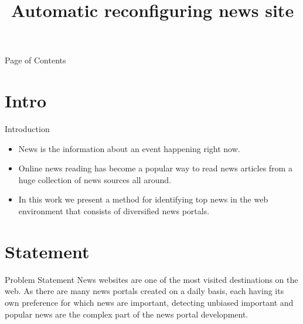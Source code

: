\documentclass{beamer}
\title{Automatic reconfiguring news site}
\begin{document}
	\begin{frame}{Page of Contents}
		\tableofcontents
	\end{frame}
	\section{Intro}
	\begin{frame}{Introduction}
		\begin{itemize}
			\item \Large{News is the information about an event happening right
			now.}
			\item Online news reading has become a popular way to read news articles from a huge collection of news sources all around.
			\item In this work we present a method for identifying top news in the web environment that consists of diversiﬁed news portals. 
		\end{itemize}
	\end{frame}
	\section{Statement}
	\begin{frame}{Problem Statement}
		 \Large{News websites are one of the most visited destinations on the web. As there are many news portals created on a daily basis, each having its own preference for which news are important, detecting unbiased important and popular news are the complex part of the news portal development.}
	\end{frame}
\end{document}
